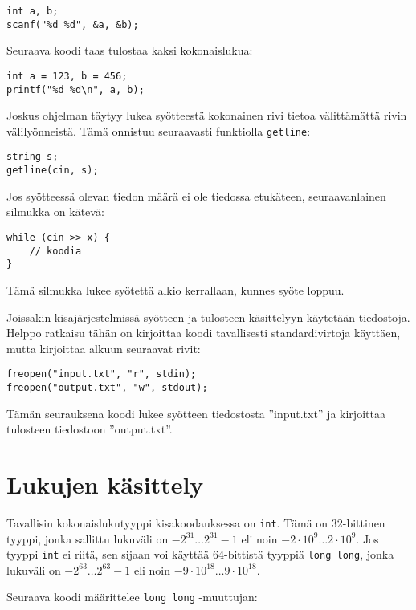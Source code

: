 \begin{lstlisting}
int a, b;
scanf("%d %d", &a, &b);
\end{lstlisting}
Seuraava koodi taas tulostaa kaksi kokonaislukua:

\begin{lstlisting}
int a = 123, b = 456;
printf("%d %d\n", a, b);
\end{lstlisting}

Joskus ohjelman täytyy lukea syötteestä
kokonainen rivi tietoa
välittämättä rivin välilyönneistä.
Tämä onnistuu seuraavasti funktiolla
\texttt{getline}:

\begin{lstlisting}
string s;
getline(cin, s);
\end{lstlisting}

Jos syötteessä olevan tiedon määrä ei ole tiedossa
etukäteen, seuraavanlainen silmukka on kätevä:

\begin{lstlisting}
while (cin >> x) {
    // koodia
}
\end{lstlisting}

Tämä silmukka lukee syötettä alkio
kerrallaan, kunnes syöte loppuu.

Joissakin kisajärjestelmissä syötteen ja tulosteen
käsittelyyn käytetään tiedostoja. Helppo ratkaisu tähän
on kirjoittaa koodi tavallisesti
standardivirtoja käyttäen,
mutta kirjoittaa alkuun seuraavat rivit:

\begin{lstlisting}
freopen("input.txt", "r", stdin);
freopen("output.txt", "w", stdout);
\end{lstlisting}
Tämän seurauksena koodi lukee syötteen tiedostosta
''input.txt'' ja kirjoittaa tulosteen
tiedostoon ''output.txt''.

\section{Lukujen käsittely}


Tavallisin kokonaislukutyyppi kisakoodauksessa on \texttt{int}.
Tämä on 32-bittinen tyyppi,
jonka sallittu lukuväli on $-2^{31} \ldots 2^{31}-1$
eli noin $-2 \cdot 10^9 \ldots 2 \cdot 10^9$.
Jos tyyppi \texttt{int} ei riitä, sen sijaan voi käyttää
64-bittistä tyyppiä
\texttt{long long}, jonka lukuväli on $-2^{63} \ldots 2^{63}-1$
eli noin $-9 \cdot 10^{18} \ldots 9 \cdot 10^{18}$.

Seuraava koodi määrittelee
\texttt{long long} -muuttujan:

